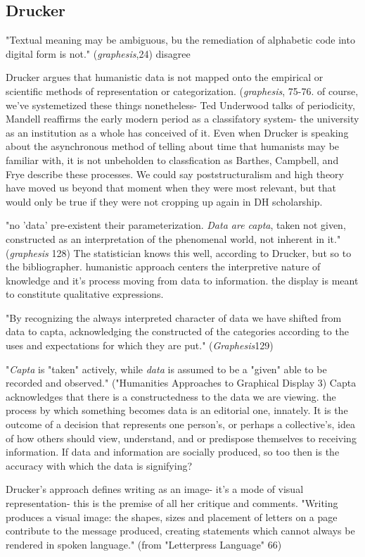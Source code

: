 \documentclass[course, english]{Notes}
\newcommand{\n}{\scalebox{2}{\textbf{\framebox{$\aleph$} } } }
\begin{document}
\subsection{Drucker}	
	\begin{outline}
	\1 "Textual meaning may be ambiguous, bu the remediation of alphabetic code into digital form is not." (\textit{graphesis},24)
		\2 \n disagree

\1 Drucker argues that humanistic data is not mapped onto the empirical or scientific methods of representation or categorization. (\textit{graphesis}, 75-76.
\2 \n of course, we've systemetized these things nonetheless- Ted Underwood talks of periodicity, Mandell reaffirms the early modern period as a classifatory system- the university as an institution as a whole has conceived of it. Even when Drucker is speaking about the asynchronous method of telling about time that humanists may be familiar with, it is not unbeholden to classfication as Barthes, Campbell, and Frye describe these processes. 
\2 \n We could say poststructuralism and high theory have moved us beyond that moment when they were most relevant, but that would only be true if they were not cropping up again in DH scholarship. 

\1 "no 'data' pre-existent their parameterization. \textit{Data are capta}, taken not given, constructed as an interpretation of the phenomenal world, not inherent in it." (\textit{graphesis} 128)
	\2 \n The statistician knows this well, according to Drucker, but so to the bibliographer. 
	\2  humanistic approach centers the interpretive nature of knowledge and it's process moving from data to information. 
	\2 the display is meant to constitute qualitative expressions. 
	
\1 "By recognizing the always interpreted character of data we have shifted from data to capta, acknowledging the constructed of the categories according to the uses and expectations for which they are put." (\textit{Graphesis}129)

\1 "\textit{Capta} is "taken" actively, while \textit{data} is assumed to be a "given" able to be recorded and observed." ("Humanities Approaches to Graphical Display 3)
	\2 Capta acknowledges that there is a constructedness to the data we are viewing.
		\3 \n the process by which something becomes data is an editorial one, innately. It is the outcome of a decision that represents one person's, or perhaps a collective's, idea of how others should view, understand, and or predispose themselves to receiving information. 
	\2 If data and information are socially produced, so too then is the accuracy with which the data is signifying?

\1 \n Drucker's approach defines writing as an image- it's a mode of visual representation- this is the premise of all her critique and comments.
	\2 "Writing produces a visual image: the shapes, sizes and placement of letters on a page contribute to the message produced, creating statements which cannot always be rendered in spoken language." (from "Letterpress Language" 66)
	

	\end{outline}
	
\end{document}
